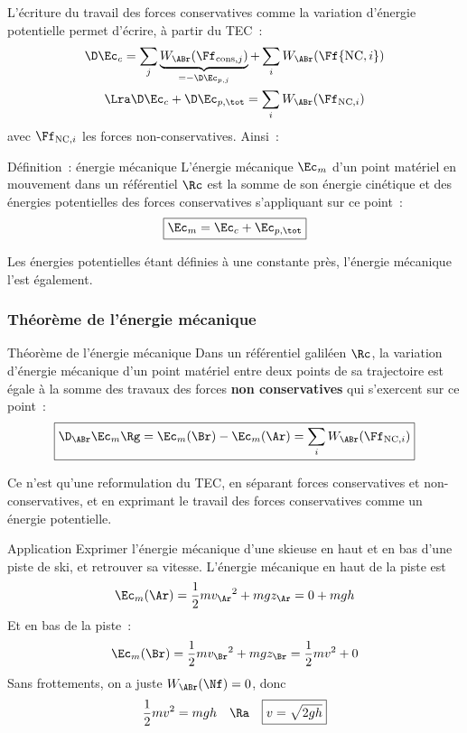 \documentclass[../main/main.tex]{subfiles}
\begin{document}
L'écriture du travail des forces conservatives comme la variation d'énergie
potentielle permet d'écrire, à partir du TEC~:
\begin{gather*}
    \D\Ec_c = \sum_j \underbrace{W_\ABr(\Ff_{{\rm cons},j})}_{=-\D\Ec_{p,j}}
        + \sum_i W_\ABr(\Ff{{\rm NC}, i})
    \\\Lra
    \D\Ec_c + \D\Ec_{p,\tot} = \sum_i W_{\ABr}(\Ff_{{\rm NC},i})
\end{gather*}
avec $\Ff_{{\rm NC},i}$ les forces non-conservatives. Ainsi~:
\begin{tdefi}{Définition~: énergie mécanique}
    L'énergie mécanique $\Ec_m$ d'un point matériel en mouvement dans un
    référentiel $\Rc$ est la somme de son énergie cinétique et des énergies
    potentielles des forces conservatives s'appliquant sur ce point~:
    \[\boxed{\Ec_m = \Ec_c + \Ec_{p, \tot}}\]
\end{tdefi}

Les énergies potentielles étant définies à une constante près, l'énergie
mécanique l'est également.

\subsubsection{Théorème de l'énergie mécanique}
\begin{tprop}{Théorème de l'énergie mécanique}
    Dans un référentiel galiléen $\Rc$, la variation d'énergie mécanique d'un
    point matériel entre deux points de sa trajectoire est égale à la somme des
    travaux des forces \textbf{non conservatives} qui s'exercent sur ce point~:
    \[\boxed{\D_{\ABr}\Ec_m\Rg = \Ec_m(\Br) - \Ec_m(\Ar) = \sum_i W_{\ABr}
    (\Ff_{{\rm NC},i})}\]
\end{tprop}

Ce n'est qu'une reformulation du TEC, en séparant forces conservatives et
non-conservatives, et en exprimant le travail des forces conservatives comme un
énergie potentielle.

\begin{rexem}{Application}
    Exprimer l'énergie mécanique d'une skieuse en haut et en bas d'une piste de
    ski, et retrouver sa vitesse.
    \tcblower
    L'énergie mécanique en haut de la piste est
    \[\Ec_m(\Ar) = \frac{1}{2}mv_{\Ar}{}^2 + mgz_{\Ar} = 0 + mgh\]
    Et en bas de la piste~:
    \[\Ec_m(\Br) = \frac{1}{2}mv_{\Br}{}^2 + mgz_{\Br} = \frac{1}{2}mv^2 + 0\]
    Sans frottements, on a juste $W_{\ABr}(\Nf) = 0$, donc
    \[\frac{1}{2}mv^2 = mgh\quad\Ra\quad\boxed{v=\sqrt{2gh}}\]
\end{rexem}
\end{document}

